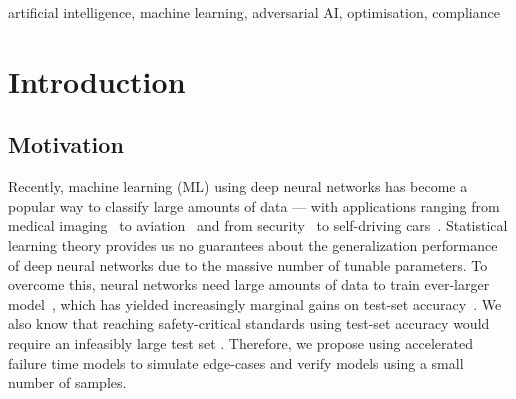 \documentclass[journal]{IEEEtran}
\begin{document}
\begin{IEEEkeywords}
artificial intelligence, machine learning, adversarial AI, optimisation, compliance
\end{IEEEkeywords}


\section{Introduction}
\subsection{Motivation}

Recently, machine learning (ML) using deep neural networks has become a popular way to classify large amounts of data --- with applications ranging from medical imaging~\cite{ai_medical_imaging} to aviation~\cite{ai_aviation} and from security~\cite{ai_security,ai_luggage,ai_prison} to self-driving cars~\cite{ai_automotive}. 
Statistical learning theory \cite{vcdimension} provides us no guarantees about the generalization performance of deep neural networks due to the massive number of tunable parameters. To overcome this, neural networks need large amounts of data\cite{desislavov2021compute,bailly2022effects} to train ever-larger model~\cite{desislavov2021compute}, which has  yielded increasingly marginal gains on test-set accuracy~\cite{sun2017revisiting}. We also know that  reaching safety-critical standards using test-set accuracy would require an infeasibly large test set \cite{meyers}. Therefore, we propose using accelerated failure time models to simulate edge-cases and verify models using a small number of samples.
\end{document}
